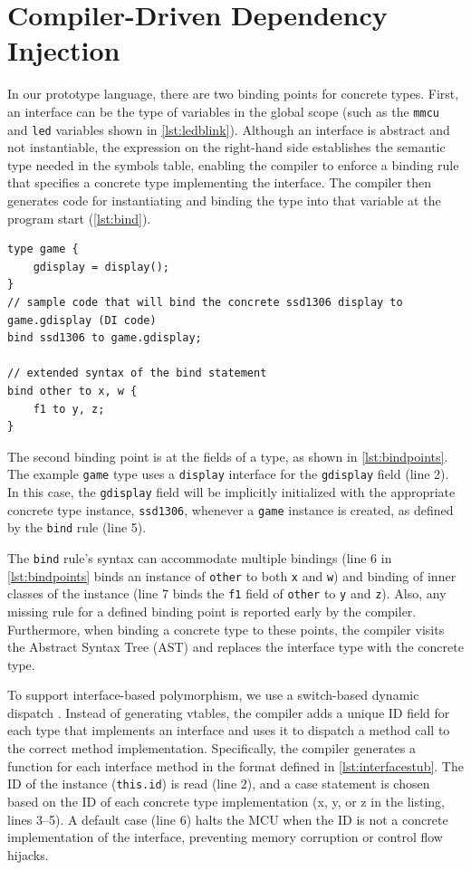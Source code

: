 \documentclass[10pt,sigplan,screen,anonymous]{acmart}
\begin{document}
\section{Compiler-Driven Dependency Injection} \label{sec:design}

In our prototype language, there are two binding points for concrete types. First, an interface can be the type of variables in the global scope (such as the {\tt mmcu} and {\tt led} variables shown in \autoref{lst:ledblink}). Although an interface is abstract and not instantiable, the expression on the right-hand side establishes the semantic type needed in the symbols table, enabling the compiler to enforce a binding rule that specifies a concrete type implementing the interface. The compiler then generates code for instantiating and binding the type into that variable at the program start (\autoref{lst:bind}).



\begin{lstlisting}[float=bp, caption=Binding points in the prototype language., label=lst:bindpoints]
type game {
    gdisplay = display();
}
// sample code that will bind the concrete ssd1306 display to game.gdisplay (DI code)
bind ssd1306 to game.gdisplay;

// extended syntax of the bind statement
bind other to x, w {
    f1 to y, z;
}
\end{lstlisting}

The second binding point is at the fields of a type, as shown in \autoref{lst:bindpoints}. The example {\tt game} type uses a {\tt display} interface for the {\tt gdisplay} field (line 2). In this case, the {\tt gdisplay} field will be implicitly initialized with the appropriate concrete type instance, {\tt ssd1306}, whenever a {\tt game} instance is created, as defined by the {\tt bind} rule (line 5). 

The {\tt bind} rule's syntax can accommodate multiple bindings (line 6 in \autoref{lst:bindpoints} binds an instance of {\tt other} to both {\tt x} and {\tt w}) and binding of inner classes of the instance (line 7 binds the {\tt f1} field of {\tt other} to {\tt y} and {\tt z}). Also, any missing rule for a defined binding point is reported early by the compiler. Furthermore, when binding a concrete type to these points, the compiler visits the Abstract Syntax Tree (AST) and replaces the interface type with the concrete type.

To support interface-based polymorphism, we use a switch-based dynamic dispatch \cite{bauer2021novt}. Instead of generating vtables, the compiler adds a unique ID field for each type that implements an interface and uses it to dispatch a method call to the correct method implementation. Specifically, the compiler generates a function for each interface method in the format defined in \autoref{lst:interfacestub}. The ID of the instance ({\tt this.id}) is read (line 2), and a case statement is chosen based on the ID of each concrete type implementation (x, y, or z in the listing, lines 3--5). A default case (line 6) halts the MCU when the ID is not a concrete implementation of the interface, preventing memory corruption or control flow hijacks.
\end{document}
